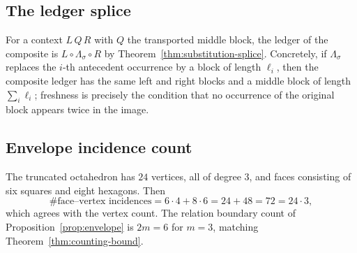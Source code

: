 \subsection{The ledger splice}

For a context $L\,Q\,R$ with $Q$ the transported middle block, the ledger of the composite is
$L\circ\Lambda_\sigma\circ R$ by Theorem~\ref{thm:substitution-splice}.  Concretely, if
$\Lambda_\sigma$ replaces the $i$-th antecedent occurrence by a block of length $\ell_i$, then
the composite ledger has the same left and right blocks and a middle block of length
$\sum_i\ell_i$; freshness is precisely the condition that no occurrence of the original block
appears twice in the image.

\subsection{Envelope incidence count}

The truncated octahedron has $24$ vertices, all of degree $3$, and faces consisting of six
squares and eight hexagons.  Then
\[
  \#\text{face--vertex incidences}=6\cdot4+8\cdot6=24+48=72=24\cdot3,
\]
which agrees with the vertex count.  The relation boundary count of
Proposition~\ref{prop:envelope} is $2m=6$ for $m=3$, matching
Theorem~\ref{thm:counting-bound}.
